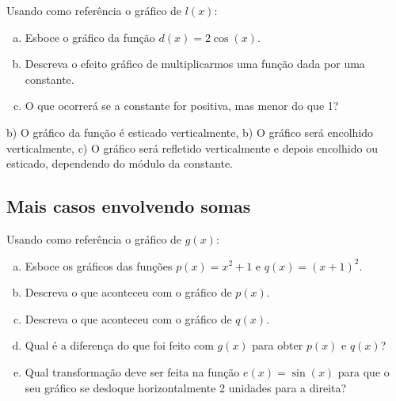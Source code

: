 \documentclass[main.tex]{subfiles}
\begin{document}
\begin{questao}
Usando como referência o gráfico de $l(x)$:
\begin{enumerate}[a)]
\item Esboce o gráfico da função $d(x)=2\cos(x)$.
\item Descreva o efeito gráfico de multiplicarmos uma função dada por uma constante.
\item O que ocorrerá se a constante for positiva, mas menor do que 1?
\end{enumerate}
\end{questao}


\begin{gabarito}
	\begin{gabaritoQuestao}
		b) O gráfico da função é esticado verticalmente, b) O gráfico será encolhido verticalmente, c) O gráfico será refletido verticalmente e depois encolhido ou esticado, dependendo do módulo da constante.
	\end{gabaritoQuestao}
\end{gabarito}

\subsection*{Mais casos envolvendo somas}

\begin{questao}
Usando como referência o gráfico de $g(x)$:
\begin{enumerate}[a)]
\item Esboce os gráficos das funções $p(x)=x^2+1$ e $q(x)=(x+1)^2$.
\item Descreva o que aconteceu com o gráfico de $p(x)$.
\item Descreva o que aconteceu com o gráfico de $q(x)$.
\item Qual é a diferença do que foi feito com $g(x)$ para obter $p(x)$ e $q(x)$?
\item Qual transformação deve ser feita na função $e(x)=\sin(x)$ para que o seu gráfico se desloque horizontalmente 2 unidades para a direita?
\end{enumerate}
\end{questao}
\end{document}
